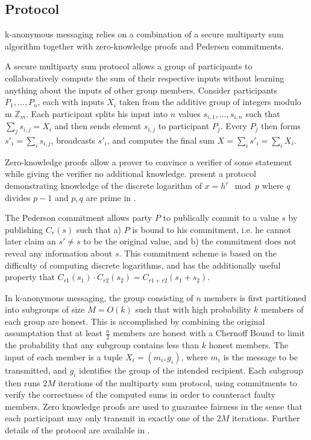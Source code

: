 \subsection{Protocol}

k-anonymous messaging relies on a combination of a secure multiparty sum algorithm
together with zero-knowledge proofs and Pedersen commitments.

A secure multiparty sum protocol allows a group of participants to collaboratively
compute the sum of their respective inputs without learning anything about the
inputs of other group members. Consider participants $P_1, \ldots, P_n$, each with
inputs $X_i$ taken from the additive group of integers modulo m $\mathbb{Z}_m$.
Each participant splits his input into $n$ values $s_{i,1}, \ldots, s_{i,n}$ such that $\sum_j s_{i,j} = X_i$
and then sends element $s_{i,j}$ to participant $P_j$. Every $P_j$ then forms
$s'_i = \sum_i s_{i,j}$, broadcasts $s'_i$, and computes the final sum $X = \sum_i s'_i = \sum_i X_i$.

Zero-knowledge proofs allow a prover to convince a verifier of some statement while
giving the verifier no additional knowledge. \citeauthor{chaum1987demonstrating}
present a protocol demonstrating knowledge of the discrete logarithm of $x = h^r \mod p$
where $q$ divides $p - 1$ and $p,q$ are prime in \cite{chaum1987demonstrating}.

The Pederson commitment \cite{pedersen1992non} allows party $P$ to publically commit
to a value $s$ by publishing $C_r(s)$ such that a) $P$ is bound to his commitment, i.e. he cannot later
claim an $s' \neq s$ to be the original value, and b) the commitment does not reveal
any information about $s$. This commitment scheme is based on the difficulty of computing discrete
logarithms, and has the additionally useful property that $C_{r1}(s_1) \cdot C_{r2}(s_2) = C_{r1 + r2}(s_1 + s_2)$.

In k-anonymous messaging, the group consisting of $n$ members is first partitioned
into subgroups of size $M = O(k)$ such that with high probability $k$ members of each group
are honest. This is accomplished by combining the original assumptation that at least
$\frac{n}{2}$ members are honest with a Chernoff Bound to limit the probability that
any subgroup contains less than $k$ honest members. The input of each member is
a tuple $X_i = (m_i, g_i)$, where $m_i$ is the message to be transmitted, and
$g_i$ identifies the group of the intended recipient. Each subgroup then runs
$2M$ iterations of the multiparty sum protocol, using commitments to verify the
correctness of the computed sums in order to counteract faulty members. Zero knowledge
proofs are used to guarantee fairness in the sense that each participant may only transmit
in exactly one of the $2M$ iterations. Further details of the protocol are available in
\cite{von2003k}.


